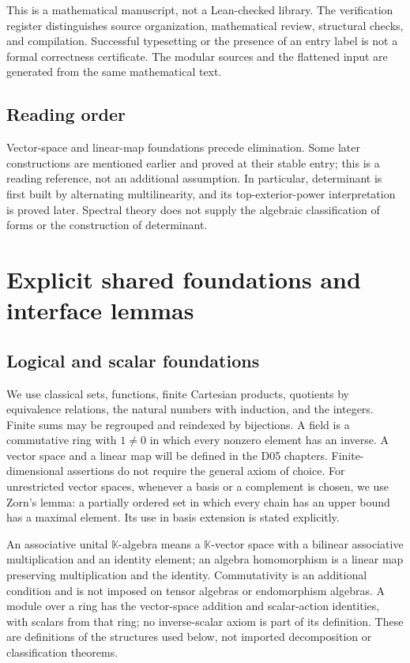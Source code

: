 \documentclass[11pt,a4paper]{book}
\theoremstyle{definition}\newtheorem{definition}[theorem]{Definition}
\theoremstyle{remark}\newtheorem{remark}[theorem]{Remark}
\newcommand{\K}{\mathbb K}\newcommand{\R}{\mathbb R}\newcommand{\C}{\mathbb C}
\begin{document}
This is a mathematical manuscript, not a Lean-checked library. The verification register distinguishes source organization, mathematical review, structural checks, and compilation. Successful typesetting or the presence of an entry label is not a formal correctness certificate. The modular sources and the flattened input are generated from the same mathematical text.

\section*{Reading order}
Vector-space and linear-map foundations precede elimination. Some later constructions are mentioned earlier and proved at their stable entry; this is a reading reference, not an additional assumption. In particular, determinant is first built by alternating multilinearity, and its top-exterior-power interpretation is proved later. Spectral theory does not supply the algebraic classification of forms or the construction of determinant.


\tableofcontents
\mainmatter

\chapter{Explicit shared foundations and interface lemmas}
\label{ch:foundations}

\section{Logical and scalar foundations}
We use classical sets, functions, finite Cartesian products, quotients by equivalence relations, the natural numbers with induction, and the integers. Finite sums may be regrouped and reindexed by bijections. A field is a commutative ring with $1\ne0$ in which every nonzero element has an inverse. A vector space and a linear map will be defined in the D05 chapters. Finite-dimensional assertions do not require the general axiom of choice. For unrestricted vector spaces, whenever a basis or a complement is chosen, we use Zorn's lemma: a partially ordered set in which every chain has an upper bound has a maximal element. Its use in basis extension is stated explicitly.

An associative unital $\K$-algebra means a $\K$-vector space with a bilinear associative multiplication and an identity element; an algebra homomorphism is a linear map preserving multiplication and the identity. Commutativity is an additional condition and is not imposed on tensor algebras or endomorphism algebras. A module over a ring has the vector-space addition and scalar-action identities, with scalars from that ring; no inverse-scalar axiom is part of its definition. These are definitions of the structures used below, not imported decomposition or classification theorems.
\end{document}
